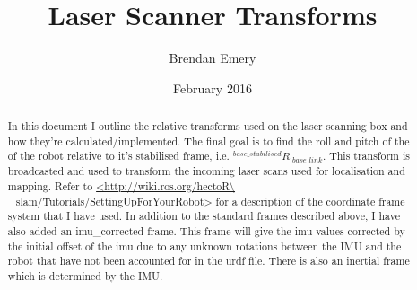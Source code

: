 \documentclass{article}
\title{Laser Scanner Transforms}
\author{Brendan Emery}
\date{February 2016}
\begin{document}
\maketitle

\begin{abstract}
\noindent In this document I outline the relative transforms used on the laser scanning box and how they're calculated/implemented. The final goal is to find the roll and pitch of the of the robot relative to it's stabilised frame, i.e. $ {^{base\_stabilised}R\ _{base\_link}} $. This transform is broadcasted and used to transform the incoming laser scans used for localisation and mapping. Refer to \url{<http://wiki.ros.org/hectoR\ _slam/Tutorials/SettingUpForYourRobot>} for a description of the coordinate frame system that I have used. In addition to the standard frames described above, I have also added an imu\_corrected frame. This frame will give the imu values corrected by the initial offset of the imu due to any unknown rotations between the IMU and the robot that have not been accounted for in the urdf file. There is also an inertial frame which is determined by the IMU.
\end{abstract}

\vspace*{1cm}

\noindent
{}
%

\vspace*{0cm}

\end{document}
